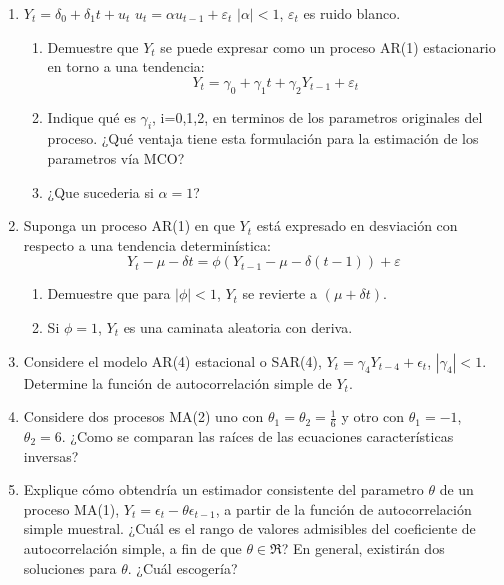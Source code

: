 \documentclass[12pt,letterpaper]{article}
\begin{document}
\begin{enumerate}
\item $Y_{t}=\delta_{0}+\delta_{1}t+u_{t}$ \hspace{4mm}  $u_{t}=\alpha u_{t-1}+\varepsilon_{t}$ \hspace{4mm} $|\alpha|<1$,  $\varepsilon_{t}$ es ruido blanco.
    \begin{enumerate}
      \item Demuestre que $Y_{t}$ se puede expresar como un proceso AR(1) estacionario en torno a una tendencia:
    \begin{equation*}
        Y_{t}=\gamma_{0}+\gamma_{1}t+\gamma_{2}Y_{t-1}+\varepsilon_{t}
    \end{equation*}
    \item Indique qué es $\gamma_{i}$, i=0,1,2, en terminos de los parametros originales del proceso. ¿Qué ventaja tiene esta formulación para la estimación de los parametros vía MCO? 
    \item ¿Que sucederia si $\alpha=1$?
     \end{enumerate}
\item Suponga un proceso AR(1) en que $Y_{t}$ está expresado en desviación con respecto a una tendencia determinística:
    \begin{equation*}
        Y_{t}-\mu-\delta t=\phi(Y_{t-1}-\mu-\delta(t-1))+\varepsilon
    \end{equation*}
    \begin{enumerate}
        \item Demuestre que para $|\phi|<1$, $Y_{t}$ se revierte a $(\mu+\delta t)$.
        \item Si $\phi=1$, $Y_{t}$ es una caminata aleatoria con deriva.
    \end{enumerate}

\item Considere el modelo AR(4) estacional o SAR(4), $Y_t = \gamma_4Y_{t-4}+\epsilon_t$, \hspace{3mm}$|\gamma_4|<1$. Determine la función de autocorrelación simple de $Y_t$.

\item Considere dos procesos MA(2) uno con $\theta_1 = \theta_2 = \frac{1}{6}$ y otro con $\theta_1 = -1$, \hspace{2mm} $\theta_2 = 6$. ¿Como se comparan las raíces de las ecuaciones características inversas?

\item Explique cómo obtendría un estimador consistente del parametro $\theta$ de un proceso MA(1), $Y_t = \epsilon_t-\theta\epsilon_{t-1}$, a partir de la función de autocorrelación simple muestral. ¿Cuál es el rango de valores admisibles del coeficiente de autocorrelación simple, a fin de que $\theta \in \Re$? En general, existirán dos soluciones para $\theta$. ¿Cuál escogería?
\end{enumerate}
\end{document}
